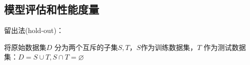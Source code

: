 \subsection{模型评估和性能度量}%
\label{sub:模型评估和性能度量}
\begin{notation}
    留出法(hold-out)：

    将原始数据集$D$ 分为两个互斥的子集$S,T$，$S$作为训练数据集，$T$ 作为测试数据集：$D=S\cup T,S\cap T=\varnothing $
\end{notation}

